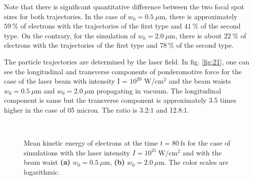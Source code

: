 Note that there is significant quantitative difference between the two focal spot sizes for both trajectories. In the case of $ w_0 = 0.5 \ \mu\mathrm{m} $, there is approximately $ 59 \ \% $ of electrons with the trajectories of the first type and $ 41 \ \% $ of the second type. On the contrary, for the simulation of $ w_0 = 2.0 \ \mu\mathrm{m} $, there is about $ 22 \ \% $ of electrons with the trajectories of the first type and $ 78 \ \% $ of the second type.

The particle trajectories are determined by the laser field. In fig. \ref{fig:21}, one can see the longitudinal and transverse components of ponderomotive force for the case of the laser beam with intensity I = $ 10^{20} $ W/cm$^2$ and the beam waists $ w_0 = 0.5 \ \mu\mathrm{m} $ and $ w_0 = 2.0 \ \mu\mathrm{m} $ propagating in vacuum. The longitudinal component is same but the transverse component is approximately 3.5 times higher in the case of 05 micron. The ratio is 3.2:1 and 12.8:1.
 
\begin{figure}[h!]
	\centering
	\\[2mm]
	\caption{Mean kinetic energy of electrons at the time $ t = 80 \ \mathrm{fs} $ for the case of simulations with the laser intensity $ I = 10^{21} \ \mathrm{W/cm^2} $ and with the beam waist \textbf{(a)} $ w_0 = 0.5 \ \mu\mathrm{m} $, \textbf{(b)} $ w_0 = 2.0 \ \mu\mathrm{m} $. The color scales are logarithmic.}
	\label{fig:17}
\end{figure}

